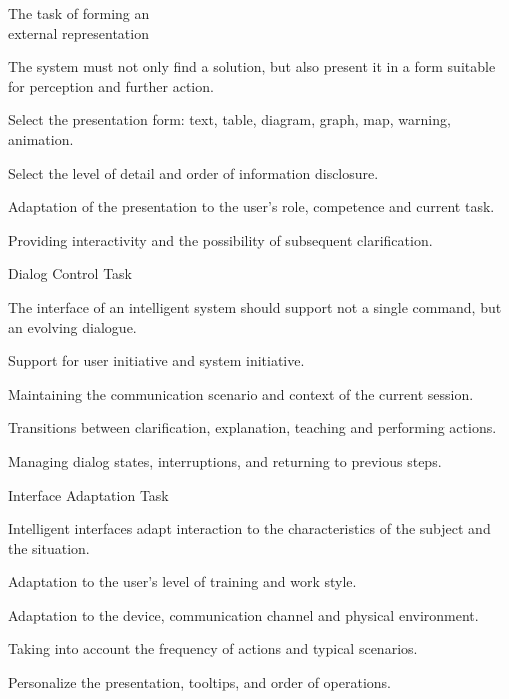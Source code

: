 \begin{frame}{The task of forming an\\ external representation}
	\topline
	\justifying
	
	The system must not only find a solution, but also present it in a form suitable for perception and further action.
	
	\begin{textitemize}
		\item Select the presentation form: text, table, diagram, graph, map, warning, animation.
		\item Select the level of detail and order of information disclosure.
		\item Adaptation of the presentation to the user's role, competence and current task.
		\item Providing interactivity and the possibility of subsequent clarification.
	\end{textitemize}
\end{frame}

\begin{frame}{Dialog Control Task}
	\topline
	\justifying
	
	The interface of an intelligent system should support not a single command, but an evolving dialogue.
	
	\begin{textitemize}
		\item Support for user initiative and system initiative.
		\item Maintaining the communication scenario and context of the current session.
		\item Transitions between clarification, explanation, teaching and performing actions.
		\item Managing dialog states, interruptions, and returning to previous steps.
	\end{textitemize}
\end{frame}

\begin{frame}{Interface Adaptation Task}
	\topline
	\justifying
	
	Intelligent interfaces adapt interaction to the characteristics of the subject and the situation.
	
	\begin{textitemize}
		\item Adaptation to the user's level of training and work style.
		\item Adaptation to the device, communication channel and physical environment.
		\item Taking into account the frequency of actions and typical scenarios.
		\item Personalize the presentation, tooltips, and order of operations.
	\end{textitemize}
\end{frame}

